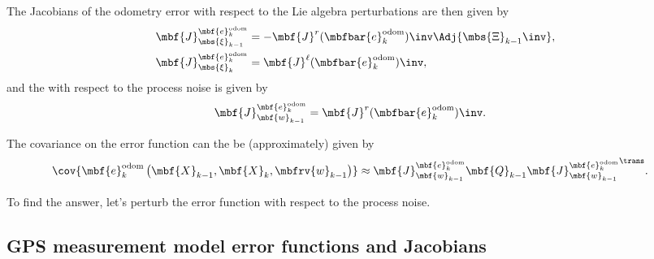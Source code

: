 \documentclass[ nobib, nofonts, notoc]{tufte-handout}
\begin{document}
    The Jacobians of the odometry error with respect to the Lie algebra perturbations are then given by
    \begin{align}
        \mbf{J}
            ^{\mbf{e}
                ^{\mathrm{odom}}
                _{k}}
            _{\mbs{\xi}_{k-1}} 
        &= 
        -\mbf{J}^{r}(\mbfbar{e}^{\mathrm{odom}}_{k})\inv
        \Adj{\mbs{\Xi}_{k-1}\inv}
        , \\
        \mbf{J}
            ^{\mbf{e}
                ^{\mathrm{odom}}
                _{k}}
            _{\mbs{\xi}_{k}} 
        &= 
        \mbf{J}^{\ell}(\mbfbar{e}^{\mathrm{odom}}_{k})\inv,       
    \end{align}
    and the with respect to the process noise is given by
    \begin{align}
        \mbf{J}
            ^{\mbf{e}
                ^{\mathrm{odom}}
                _{k}}
            _{\mbf{w}_{k-1}} 
        &=
        \mbf{J}^{r}(\mbfbar{e}^{\mathrm{odom}}_{k})\inv.
    \end{align}
    
    The covariance on the error function can the be (approximately) given by
    \begin{align}
        \cov{
            \mbf{e}
              ^{\mathrm{odom}}
              _{k}
            \left(
              \mbf{X}_{k-1},
              \mbf{X}_{k},
              \mbfrv{w}_{k-1}
            \right)
        }
        &\approx
        \mbf{J}
            ^{\mbf{e}
                ^{\mathrm{odom}}
                _{k}}
            _{\mbf{w}_{k-1}}
        \mbf{Q}_{k-1}
        {
        \mbf{J}
            ^{\mbf{e}
                ^{\mathrm{odom}}
                _{k}}
            _{\mbf{w}_{k-1}}
        }^{\trans}.
    \end{align}

    To find the answer, let's perturb the error function with respect to the process noise.
    \subsection{GPS measurement model error functions and Jacobians}
    

    \clearpage
    
    
\end{document}
